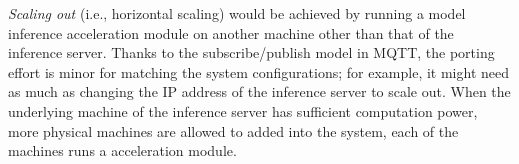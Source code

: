 \documentclass[conference]{IEEEtran}
\begin{document}
\emph{Scaling out} (i.e., horizontal scaling) would be achieved by running a model inference acceleration module on another machine other than that of the inference server. Thanks to the subscribe/publish model in MQTT, the porting effort is minor for matching the system configurations; for example, it might need as much as changing the IP address of the inference server to scale out. When the underlying machine of the inference server has sufficient computation power, more physical machines are allowed to added into the system, each of the machines runs a acceleration module.

%
%
\end{document}
